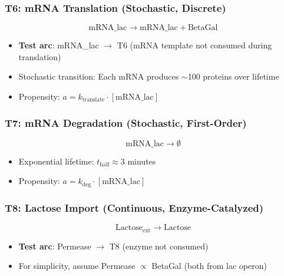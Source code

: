 \subsubsection{T6: mRNA Translation (Stochastic, Discrete)}

\begin{equation}
\text{mRNA\_lac} \to \text{mRNA\_lac} + \text{BetaGal}
\end{equation}

\begin{itemize}
    \item \textbf{Test arc}: mRNA\_lac $\to$ T6 (mRNA template not consumed during translation)
    \item Stochastic transition: Each mRNA produces $\sim$100 proteins over lifetime
    \item Propensity: $a = k_{\text{translate}} \cdot [\text{mRNA\_lac}]$
\end{itemize}

\subsubsection{T7: mRNA Degradation (Stochastic, First-Order)}

\begin{equation}
\text{mRNA\_lac} \to \emptyset
\end{equation}

\begin{itemize}
    \item Exponential lifetime: $t_{\text{half}} \approx 3$ minutes
    \item Propensity: $a = k_{\text{deg}} \cdot [\text{mRNA\_lac}]$
\end{itemize}

\subsubsection{T8: Lactose Import (Continuous, Enzyme-Catalyzed)}

\begin{equation}
\text{Lactose}_{\text{ext}} \to \text{Lactose}
\end{equation}

\begin{itemize}
    \item \textbf{Test arc}: Permease $\to$ T8 (enzyme not consumed)
    \item For simplicity, assume Permease $\propto$ BetaGal (both from lac operon)
\end{itemize}

